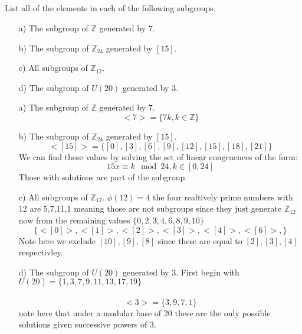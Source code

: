 \documentclass[11pt]{article}
\theoremstyle{definition}  %
\newcommand{\Z}{\mathbb{Z}}
\newcommand{\bigline}{\\\noindent\makebox[\linewidth]{\rule{\paperwidth}{0.4pt}}\\}
\begin{document}
\\\\
\bigline
\begin{tcolorbox}[title=Question 2]
\item List all of the elements in each of the following subgroups.
  \begin{itemize}
     \item[a)] The subgroup of $\Z$ generated by $7$.
     \item[b)] The subgroup of $\Z_{24}$ generated by $[15]$.
     \item[c)] All subgroups of $\Z_{12}$.
     \item[d)] The subgroup of $U(20)$ generated by $3$.
  \end{itemize}
\end{tcolorbox}
  \begin{itemize}
     \item[a)] The subgroup of $\Z$ generated by $7$.
       \[
         <7>=\{7k, k \in \Z\}
       \]
     \item[b)] The subgroup of $\Z_{24}$ generated by $[15]$.
       $$
       <[15]>=\{[0],[3],[6],[9],[12],[15],[18],[21]\}
       $$
       We can find these values by solving the set of linear congruences of the form:
       \[
         15x\equiv k \mod 24, k \in [0,24]
       \]
       Those with solutions are part of the subgroup.
     \item[c)] All subgroups of $\Z_{12}$.
       $\phi(12)=4$ the four realtively prime numbers with 12 are 5,7,11,1 meaning those are not subgroups since they just generate $\Z_{12}$ now from the remaining values $\{0,2,3,4,6,8,9,10\}$
       \[
         \{<[0]>,<[1]>,<[2]>,<[3]>,<[4]>,<[6]>,\}
       \]
       Note here we exclude $[10],[9],[8]$ since these are equal to $[2],[3],[4]$ respectivley.
     \item[d)] The subgroup of $U(20)$ generated by $3$.
       First begin with $U(20)=\{1,3,7,9,11,13,17,19\}$\\\\
      $$<3>=\{3,9,7,1\}$$
       note here that under a modular base of 20 these are the only possible solutions given successive powers of 3.
  \end{itemize}
  \bigline
\end{document}
